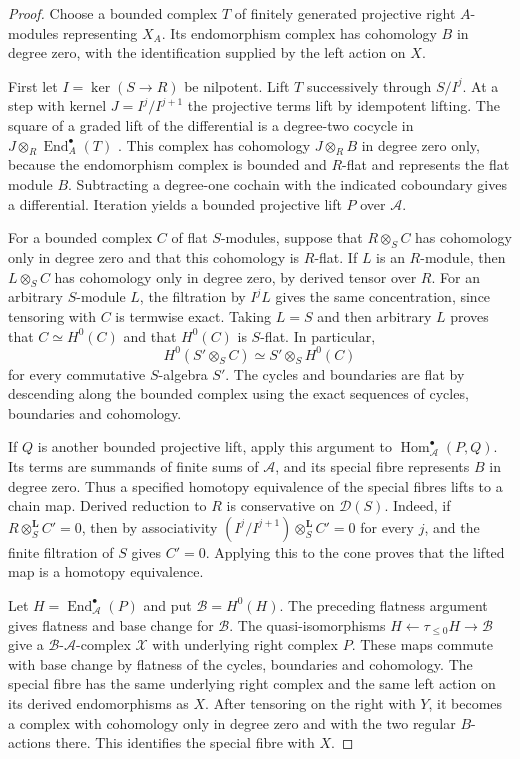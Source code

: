 \documentclass[12pt,a4paper,english,reqno]{amsart}
\numberwithin{equation}{section}
\theoremstyle{plain}
\theoremstyle{definition}
\begin{document}
\begin{proof}
Choose a bounded complex $T$ of finitely generated projective right
$A$-modules representing $X_A$. Its endomorphism complex has
cohomology $B$ in degree zero, with the identification supplied
by the left action on $X$.

First let $I=\ker(S\to R)$ be nilpotent. Lift $T$ successively
through $S/I^j$. At a step with kernel $J=I^j/I^{j+1}$ the
projective terms lift by idempotent lifting. The square of a
graded lift of the differential is a degree-two cocycle in
$J\otimes_R\operatorname{End}_A^\bullet(T)$
\cite{Rickard1991Lifting,Lowen2005Obstruction}.
This complex has cohomology $J\otimes_R B$ in degree zero only,
because the endomorphism complex is bounded and $R$-flat and
represents the flat module $B$. Subtracting a degree-one cochain
with the indicated coboundary gives a differential. Iteration
yields a bounded projective lift $P$ over $\mathcal A$.

For a bounded complex $C$ of flat $S$-modules, suppose that
$R\otimes_S C$ has cohomology only in degree zero and that this
cohomology is $R$-flat. If $L$ is an $R$-module, then
$L\otimes_S C$ has cohomology only in degree zero, by derived
tensor over $R$. For an arbitrary $S$-module $L$, the filtration
by $I^jL$ gives the same concentration, since tensoring with $C$
is termwise exact. Taking $L=S$ and then arbitrary $L$ proves
that $C\simeq H^0(C)$ and that $H^0(C)$ is $S$-flat. In particular,
\[
 H^0(S'\otimes_S C)\simeq S'\otimes_S H^0(C)
\]
for every commutative $S$-algebra $S'$. The cycles and boundaries
are flat by descending along the bounded complex using the exact
sequences of cycles, boundaries and cohomology.

If $Q$ is another bounded projective lift, apply this argument
to $\operatorname{Hom}_{\mathcal A}^\bullet(P,Q)$. Its terms are
summands of finite sums of $\mathcal A$, and its special fibre
represents $B$ in degree zero. Thus a specified homotopy
equivalence of the special fibres lifts to a chain map.
Derived reduction to $R$ is conservative on $\mathcal D(S)$.
Indeed, if $R\otimes_S^{\mathbf L}C'=0$, then by associativity
$(I^j/I^{j+1})\otimes_S^{\mathbf L}C'=0$ for every $j$, and the
finite filtration of $S$ gives $C'=0$. Applying this to the
cone proves that the lifted map is a homotopy equivalence.

Let $H=\operatorname{End}_{\mathcal A}^\bullet(P)$ and put
$\mathcal B=H^0(H)$. The preceding flatness argument gives
flatness and base change for $\mathcal B$. The
quasi-isomorphisms $H\leftarrow\tau_{\leq0}H\to\mathcal B$
give a $\mathcal B$-$\mathcal A$-complex $\mathcal X$ with
underlying right complex $P$. These maps commute with base
change by flatness of the cycles, boundaries and cohomology.
The special fibre has the same underlying right complex and
the same left action on its derived endomorphisms as $X$.
After tensoring on the right with $Y$, it becomes a complex
with cohomology only in degree zero and with the two regular
$B$-actions there. This identifies the special fibre with $X$.


\end{proof}
\end{document}
